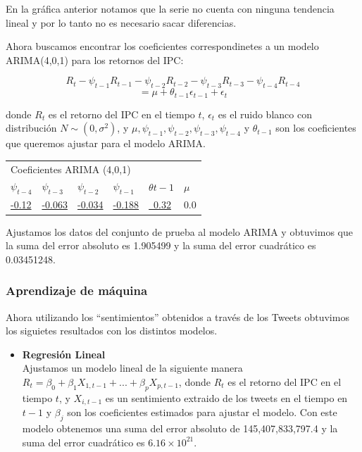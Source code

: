 \documentclass[12pt,reqno,letter]{article}
\begin{document}
\begin{multicols}{2}
En la gráfica anterior notamos que la serie no cuenta con ninguna tendencia lineal y por lo tanto no es necesario sacar diferencias.

Ahora buscamos encontrar los coeficientes correspondinetes a un modelo ARIMA(4,0,1) para los retornos del IPC:

$$R_t-\psi_{t-1}R_{t-1}-\psi_{t-2}R_{t-2}-\psi_{t-3}R_{t-3}-\psi_{t-4}R_{t-4}$$ $$=\mu+\theta_{t-1}\epsilon_{t-1}+\epsilon_t$$

donde $R_t$ es el retorno del IPC en el tiempo $t$, $\epsilon_t$ es el ruido blanco con distribución $N \sim (0, \sigma ^2)$, y $\mu, \psi_{t-1}, \psi_{t-2}, \psi_{t-3}, \psi_{t-4}$ y $\theta_{t-1}$ son los coeficientes que queremos ajustar para el modelo ARIMA.

\begin{center}
\begin{tabular}{llllll}
\multicolumn{6}{l}{Coeficientes ARIMA (4,0,1)}                                          \\
$\psi_{t-4}$           & $\psi_{t-3}$    & $\psi_{t-2}$    & $\psi_{t-1}$    & $\theta{t-1}$         & $\mu$   \\ 
\hline
\uline{-0.12} & \uline{-0.063} & \uline{-0.034} & \uline{-0.188} & \uline{~0.32} & 0.0 
\end{tabular}
\end{center}

Ajustamos los datos del conjunto de prueba al modelo ARIMA y obtuvimos que la suma del error absoluto es 1.905499 y la suma del error cuadrático es 0.03451248.


\subsubsection{Aprendizaje de máquina }

Ahora utilizando los ``sentimientos'' obtenidos a través de los Tweets obtuvimos los siguietes resultados con los distintos modelos.
\begin{itemize}
  \item\textbf{ Regresión Lineal} \\
  Ajustamos un modelo lineal de la siguiente manera $R_t=\beta_0+\beta_1 X_{1,t-1}+...+\beta_p X_{p,t-1}$, donde $R_t$ es el retorno del IPC en el tiempo $t$, y $X_{i,t-1}$ es un sentimiento extraido de los tweets en el tiempo en $t-1$ y $\beta_j$ son los coeficientes estimados para ajustar el modelo. Con este modelo obtenemos una suma del error absoluto de 145,407,833,797.4 y la suma del error cuadrático es $6.16 \times 10^{21}$.
  

\end{itemize}
\end{multicols}
\end{document}
